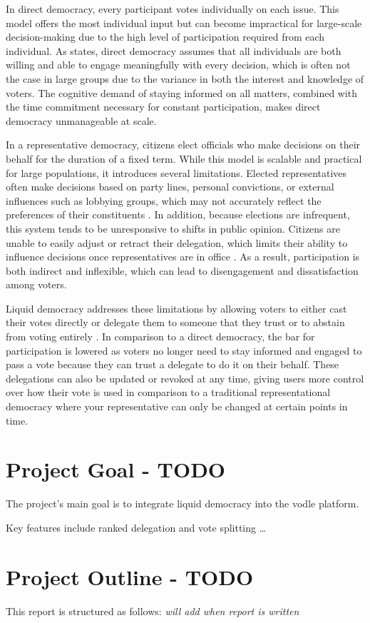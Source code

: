 In direct democracy, every participant votes individually on each issue. This model offers the most individual input but can become impractical for large-scale decision-making due to the high level of participation required from each individual. As \cite{ford_delegative_2002} states, direct democracy assumes that all individuals are both willing and able to engage meaningfully with every decision, which is often not the case in large groups due to the variance in both the interest and knowledge of voters. The cognitive demand of staying informed on all matters, combined with the time commitment necessary for constant participation, makes direct democracy unmanageable at scale.

In a representative democracy, citizens elect officials who make decisions on their behalf for the duration of a fixed term. While this model is scalable and practical for large populations, it introduces several limitations. Elected representatives often make decisions based on party lines, personal convictions, or external influences such as lobbying groups, which may not accurately reflect the preferences of their constituents \citep{blum_liquid_2016}. In addition, because elections are infrequent, this system tends to be unresponsive to shifts in public opinion. Citizens are unable to easily adjust or retract their delegation, which limits their ability to influence decisions once representatives are in office \citep{blum_liquid_2016}. As a result, participation is both indirect and inflexible, which can lead to disengagement and dissatisfaction among voters.

Liquid democracy addresses these limitations by allowing voters to either cast their votes directly or delegate them to someone that they trust or to abstain from voting entirely \citep{blum_liquid_2016}. In comparison to a direct democracy, the bar for participation is lowered as voters no longer need to stay informed and engaged to pass a vote because they can trust a delegate to do it on their behalf.
These delegations can also be updated or revoked at any time, giving users more control over how their vote is used in comparison to a traditional representational democracy where your representative can only be changed at certain points in time.

\section{Project Goal - TODO}
The project's main goal is to integrate liquid democracy into the vodle platform.

Key features include ranked delegation and vote splitting \dots

\section{Project Outline - TODO}
This report is structured as follows:
\textit{will add when report is written}